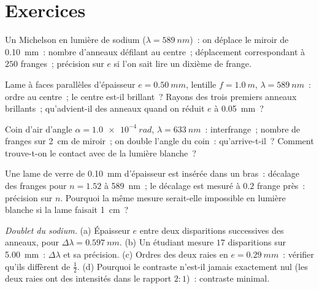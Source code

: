 \section{Exercices}

\begin{exercise}[$\star$]\label{exo:b2:michelson:1}
Un Michelson en lumière de sodium ($\lambda = \qty{589}{nm}$)~: on déplace le miroir de
\qty{0.10}{mm}~: nombre d'anneaux défilant au centre~; déplacement
correspondant à $250$ franges~; précision sur $e$ si l'on sait lire un dixième
de frange.
\end{exercise}

\begin{exercise}[$\star$]\label{exo:b2:michelson:2}
Lame à faces parallèles d'épaisseur $e = \qty{0.50}{mm}$, lentille $f = \qty{1.0}{m}$, $\lambda =
\qty{589}{nm}$~: ordre au centre~; le centre est-il brillant~? Rayons des
trois premiers anneaux brillants~; qu'advient-il des anneaux quand on réduit $e$
à \qty{0.05}{mm}~?
\end{exercise}

\begin{exercise}[$\star$]\label{exo:b2:michelson:3}
Coin d'air d'angle $\alpha = \qty{1.0e-4}{rad}$, $\lambda = \qty{633}{nm}$~: interfrange~;
nombre de franges sur \qty{2}{cm} de miroir~; on double l'angle du coin~:
qu'arrive-t-il~? Comment trouve-t-on le contact avec de la lumière blanche~?
\end{exercise}

\begin{exercise}[$\star$]\label{exo:b2:michelson:4}
Une lame de verre de \qty{0.10}{mm} d'épaisseur est insérée dans un bras~: décalage des franges pour
$n = 1.52$ à \qty{589}{nm}~; le décalage est mesuré à $0.2$ frange près~: précision
sur $n$. Pourquoi la même mesure serait-elle impossible en lumière blanche
si la lame faisait \qty{1}{cm}~?
\end{exercise}

\begin{exercise}[$\star\star$]\label{exo:b2:michelson:5}
\emph{Doublet du sodium.} (a) Épaisseur $e$ entre deux disparitions
successives des anneaux, pour $\Delta\lambda = \qty{0.597}{nm}$. (b) Un étudiant
mesure $17$ disparitions sur \qty{5.00}{mm}~: $\Delta\lambda$ et sa précision.
(c) Ordres des deux raies en $e = \qty{0.29}{mm}$~: vérifier qu'ils diffèrent de
$\tfrac12$. (d) Pourquoi le contraste n'est-il jamais exactement nul (les deux raies ont des
intensités dans le rapport $2 : 1$)~: contraste minimal.
\end{exercise}

